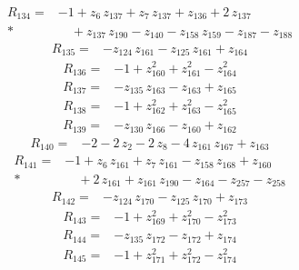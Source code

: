 \documentclass[10pt]{article}
\begin{document}
\begin{align*}
R_{134}={}& - 1 + z_{6}\,z_{137} + z_{7}\,z_{137} + z_{136} + 2\,z_{137} \\*
&\quad + z_{137}\,z_{190} - z_{140} - z_{158}\,z_{159} - z_{187} - z_{188}
\end{align*}
\begin{align*}
R_{135}={}& - z_{124}\,z_{161} - z_{125}\,z_{161} + z_{164}
\end{align*}
\begin{align*}
R_{136}={}& - 1 + z_{160}^{2} + z_{161}^{2} - z_{164}^{2}
\end{align*}
\begin{align*}
R_{137}={}& - z_{135}\,z_{163} - z_{163} + z_{165}
\end{align*}
\begin{align*}
R_{138}={}& - 1 + z_{162}^{2} + z_{163}^{2} - z_{165}^{2}
\end{align*}
\begin{align*}
R_{139}={}& - z_{130}\,z_{166} - z_{160} + z_{162}
\end{align*}
\begin{align*}
R_{140}={}& - 2 - 2\,z_{2} - 2\,z_{8} - 4\,z_{161}\,z_{167} + z_{163}
\end{align*}
\begin{align*}
R_{141}={}& - 1 + z_{6}\,z_{161} + z_{7}\,z_{161} - z_{158}\,z_{168} + z_{160} \\*
&\quad + 2\,z_{161} + z_{161}\,z_{190} - z_{164} - z_{257} - z_{258}
\end{align*}
\begin{align*}
R_{142}={}& - z_{124}\,z_{170} - z_{125}\,z_{170} + z_{173}
\end{align*}
\begin{align*}
R_{143}={}& - 1 + z_{169}^{2} + z_{170}^{2} - z_{173}^{2}
\end{align*}
\begin{align*}
R_{144}={}& - z_{135}\,z_{172} - z_{172} + z_{174}
\end{align*}
\begin{align*}
R_{145}={}& - 1 + z_{171}^{2} + z_{172}^{2} - z_{174}^{2}
\end{align*}
\end{document}
